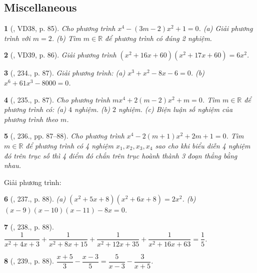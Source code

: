 \documentclass{article}
\newtheorem{baitoan}{}
\begin{document}
\subsection{Miscellaneous}

\begin{baitoan}[\cite{Tuyen_Toan_9_old}, VD38, p. 85]
	Cho phương trình $x^4 - (3m - 2)x^2 + 1 = 0$. (a) Giải phương trình với $m = 2$. (b) Tìm $m\in\mathbb{R}$ để phương trình có đúng 2 nghiệm.
\end{baitoan}

\begin{baitoan}[\cite{Tuyen_Toan_9_old}, VD39, p. 86]
	Giải phương trình $(x^2 + 16x + 60)(x^2 + 17x + 60) = 6x^2$.
\end{baitoan}

\begin{baitoan}[\cite{Tuyen_Toan_9_old}, 234., p. 87]
	Giải phương trình: (a) $x^3 + x^2 - 8x - 6 = 0$. (b) $x^6 + 61x^3 - 8000 = 0$.
\end{baitoan}

\begin{baitoan}[\cite{Tuyen_Toan_9_old}, 235., p. 87]
	Cho phương trình $mx^4 + 2(m - 2)x^2 + m = 0$.  Tìm $m\in\mathbb{R}$ để phương trình có: (a) $4$ nghiệm. (b) $2$ nghiệm. (c) Biện luận số nghiệm của phương trình theo $m$.
\end{baitoan}

\begin{baitoan}[\cite{Tuyen_Toan_9_old}, 236., pp. 87--88]
	Cho phương trình $x^4 - 2(m + 1)x^2 + 2m + 1 = 0$. Tìm $m\in\mathbb{R}$ để phương trình có 4 nghiệm $x_1,x_2,x_3,x_4$ sao cho khi biểu diễn 4 nghiệm đó trên trục số thì 4 điểm đó chắn trên trục hoành thành 3 đoạn thẳng bằng nhau.
\end{baitoan}
Giải phương trình:

\begin{baitoan}[\cite{Tuyen_Toan_9_old}, 237., p. 88]
	(a) $(x^2 + 5x + 8)(x^2 + 6x + 8) = 2x^2$. (b) $(x - 9)(x - 10)(x - 11) - 8x = 0$.
\end{baitoan}

\begin{baitoan}[\cite{Tuyen_Toan_9_old}, 238., p. 88]
	$\dfrac{1}{x^2 + 4x + 3} + \dfrac{1}{x^2 + 8x + 15} + \dfrac{1}{x^2 + 12x + 35} + \dfrac{1}{x^2 + 16x + 63}  = \dfrac{1}{5}$.
\end{baitoan}

\begin{baitoan}[\cite{Tuyen_Toan_9_old}, 239., p. 88]
	$\dfrac{x + 5}{3} - \dfrac{x - 3}{5} = \dfrac{5}{x - 3} - \dfrac{3}{x + 5}$.
\end{baitoan}
\end{document}
